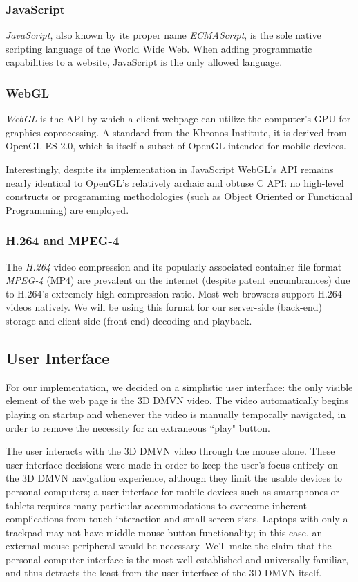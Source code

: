 \subsubsection{JavaScript}
\emph{JavaScript}, also known by its proper name \emph{ECMAScript}, is the sole native scripting language of the World Wide Web. When adding programmatic capabilities to a website, JavaScript is the only allowed language.\cite{javascript}
\subsubsection{WebGL}
\emph{WebGL} is the API by which a client webpage can utilize the computer's GPU for graphics coprocessing. A standard from the Khronos Institute, it is derived from OpenGL ES 2.0, which is itself a subset of OpenGL intended for mobile devices.\cite{webgl} \par
Interestingly, despite its implementation in JavaScript WebGL's API remains nearly identical to OpenGL's relatively archaic and obtuse C API: no high-level constructs or programming methodologies (such as Object Oriented or Functional Programming) are employed.
\subsubsection{H.264 and MPEG-4}
The \emph{H.264} video compression\cite{h264} and its popularly associated container file format \emph{MPEG-4} (MP4) are prevalent on the internet (despite patent encumbrances) due to H.264's extremely high compression ratio. Most web browsers support H.264 videos natively. We will be using this format for our server-side (back-end) storage and client-side (front-end) decoding and playback.

\subsection{User Interface}
\label{ui}
For our implementation, we decided on a simplistic user interface: the only visible element of the web page is the 3D DMVN video. The video automatically begins playing on startup and whenever the video is manually temporally navigated, in order to remove the necessity for an extraneous ``play" button.
\par The user interacts with the 3D DMVN video through the mouse alone. These user-interface decisions were made in order to keep the user's focus entirely on the 3D DMVN navigation experience, although they limit the usable devices to personal computers; a user-interface for mobile devices such as smartphones or tablets requires many particular accommodations to overcome inherent complications from touch interaction and small screen sizes. Laptops with only a trackpad may not have middle mouse-button functionality; in this case, an external mouse peripheral would be necessary. We'll make the claim that the personal-computer interface is the most well-established and universally familiar, and thus detracts the least from the user-interface of the 3D DMVN itself.

